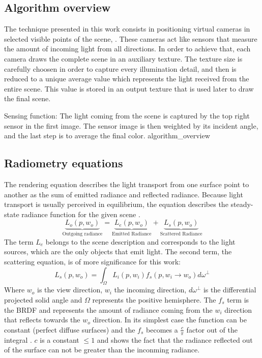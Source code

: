 \documentclass[10pt, conference]{IEEEtran}
\begin{document}
\subsection{Algorithm overview}
%
The technique presented in this work consists in positioning virtual cameras in selected visible points of the scene, .
These cameras act like sensors that measure the amount of incoming light from all directions. 
In order to achieve that, each camera draws the complete scene in an auxiliary texture. 
The texture size is carefully choosen in order to capture every illumination detail,
 and then is reduced to a unique average value which represents the light received 
from the entire scene. 
This value is stored in an output texture that is used later to draw the final scene. 

\subimages
	{Sensing function: The light coming from the scene is captured by the top right sensor in the first image. 
	The sensor image is then weighted by its incident angle, and the last step is to average the final color.}
	{algorithm_overview}{
}

\subsection{Radiometry equations}
%
The rendering equation \cite{The_rendering_equation} describes the light transport from one surface point to another as the sum of emitted radiance and reflected radiance. Because light transport is usually perceived in equilibrium, the equation describes the steady-state radiance function for the given scene \cite{The_rendering_equation}.
\[
	\underbrace{L_o(p,w_o)}_\text{Outgoing radiance} = \underbrace{L_e(p,w_o)}_\text{Emitted Radiance} + \underbrace{L_s(p,w_o)}_\text{Scattered Radiance}
\]
The term $L_e$ belongs to the scene description and corresponds to the light sources, which are the only objects that emit light. The second term, the scattering equation, is of more significance for this work: 
\[
	L_s(p,w_o) = \int_ \Omega L_i(p,w_i)f_s(p,w_i\rightarrow w_o)d\omega^\perp
\]
Where $w_o$ is the view direction, $w_i$ the incoming direction, $d\omega^\perp$ is the differential projected solid angle and
$\Omega$ represents the positive hemisphere. 
The $f_s$ term is the BRDF \cite{brdf} and represents the amount of radiance coming from the $w_i$ direction that reflects towards the $w_o$ direction. 
In its simplest case the function can be constant (perfect diffuse surfaces) and the $f_s$ becomes a $\frac{c}{\pi}$ factor out of the integral \cite{perfect_diffuse_surfaces}.
$c$ is a constant $\leq 1$ and shows the fact that the radiance reflected out of the surface can not be greater than the inconming radiance.\
\end{document}
